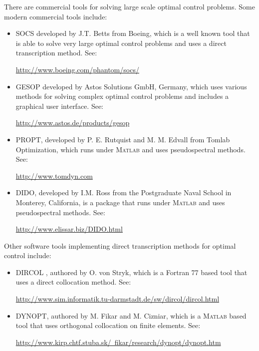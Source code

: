 \documentclass[a4paper,11pt]{report}    %
\begin{document}
There are commercial tools for solving large scale optimal control problems. Some
modern commercial tools include:
\begin{itemize}
\item SOCS developed by J.T. Betts from  Boeing,  which is a well known tool that is
able to solve very large optimal control problems and uses a direct transcription  method. See:
\begin{center}
\href{http://www.boeing.com/phantom/socs/}{http://www.boeing.com/phantom/socs/}
\end{center}

\item GESOP developed by Astos Solutions GmbH, Germany,  which uses various methods for solving complex optimal control problems
and includes a graphical user interface. See:
\begin{center}
\href{http://www.astos.de/products/gesop}{http://www.astos.de/products/gesop}
\end{center}

 \item  PROPT, developed by P. E.  Rutquist and M. M. Edvall from Tomlab Optimization, which runs under \textsc{Matlab} and
uses pseudospectral methods. See:

\begin{center}
\href{http://www.tomdyn.com}{http://www.tomdyn.com}
\end{center}
 \item DIDO, developed by I.M. Ross from the Postgraduate Naval School
in Monterey, California,  is a package that runs under \textsc{Matlab} and uses pseudospectral methods. See:

\begin{center}
 \href{http://www.elissar.biz/DIDO.html}{http://www.elissar.biz/DIDO.html}
\end{center}



\end{itemize}

Other software tools implementing direct transcription methods for optimal control include:

\begin{itemize}
 \item DIRCOL , authored by O. von Stryk, which is a Fortran 77 based tool that uses a direct collocation method. See:
\begin{center}
 \href{http://www.sim.informatik.tu-darmstadt.de/sw/dircol/dircol.html}{http://www.sim.informatik.tu-darmstadt.de/sw/dircol/dircol.html}
\end{center}

 \item DYNOPT, authored by M. Fikar and M. Cizniar, which is a \textsc{Matlab} based
tool that uses orthogonal collocation on finite elements. See:
\begin{center}
\href{http://www.kirp.chtf.stuba.sk/~fikar/research/dynopt/dynopt.htm}{http://www.kirp.chtf.stuba.sk/~fikar/research/dynopt/dynopt.htm}
\end{center}

\end{itemize}
\end{document}
